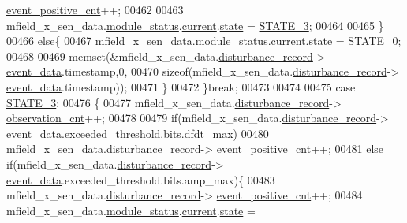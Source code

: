 \begin{DoxyCode}
      \hyperlink{a00028_a7397b9d76d4b57500f27bb23d258a18a}{event\_positive\_cnt}++;
00462 
00463                mfield\_x\_sen\_data.\hyperlink{a00025_adfab5a5d8b45a93dfb13edb24e2b80e3}{module\_status}.\hyperlink{a00019_acf41ffc11da291c2f9f0fcb02ee72b98}{current}.\hyperlink{a00019_a6b8d8e916bc56265a3fd279bd26b6d1b}{state} = 
      \hyperlink{a00021_ad87f1bc8466a25d9f7da68717d324a22}{STATE\_3};
00464 
00465              \}
00466              \textcolor{keywordflow}{else}\{
00467                mfield\_x\_sen\_data.\hyperlink{a00025_adfab5a5d8b45a93dfb13edb24e2b80e3}{module\_status}.\hyperlink{a00019_acf41ffc11da291c2f9f0fcb02ee72b98}{current}.\hyperlink{a00019_a6b8d8e916bc56265a3fd279bd26b6d1b}{state} = 
      \hyperlink{a00021_ad6739dbbe5581cac99b7dc8a5e09949c}{STATE\_0};
00468 
00469                memset(&mfield\_x\_sen\_data.\hyperlink{a00025_ac9b38e2c1d3f1013a88d33506c754152}{disturbance\_record}->
      \hyperlink{a00028_a8c0bda69e71ef674e60da47ad0be9ab0}{event\_data}.timestamp,0,
00470                                  \textcolor{keyword}{sizeof}(mfield\_x\_sen\_data.\hyperlink{a00025_ac9b38e2c1d3f1013a88d33506c754152}{disturbance\_record}->
      \hyperlink{a00028_a8c0bda69e71ef674e60da47ad0be9ab0}{event\_data}.timestamp));
00471             \}
00472         \}\textcolor{keywordflow}{break};
00473 
00474 
00475         \textcolor{keywordflow}{case} \hyperlink{a00021_ad87f1bc8466a25d9f7da68717d324a22}{STATE\_3}: 
00476         \{
00477             mfield\_x\_sen\_data.\hyperlink{a00025_ac9b38e2c1d3f1013a88d33506c754152}{disturbance\_record}->
      \hyperlink{a00028_ad5b0bac02ce266b91b2b52a1c3ea1d78}{observation\_cnt}++;
00478 
00479             \textcolor{keywordflow}{if}(mfield\_x\_sen\_data.\hyperlink{a00025_ac9b38e2c1d3f1013a88d33506c754152}{disturbance\_record}->
      \hyperlink{a00028_a8c0bda69e71ef674e60da47ad0be9ab0}{event\_data}.exceeded\_threshold.bits.dfdt\_max)
00480                mfield\_x\_sen\_data.\hyperlink{a00025_ac9b38e2c1d3f1013a88d33506c754152}{disturbance\_record}->
      \hyperlink{a00028_a7397b9d76d4b57500f27bb23d258a18a}{event\_positive\_cnt}++;
00481             \textcolor{keywordflow}{else}  \textcolor{keywordflow}{if}(mfield\_x\_sen\_data.\hyperlink{a00025_ac9b38e2c1d3f1013a88d33506c754152}{disturbance\_record}->
      \hyperlink{a00028_a8c0bda69e71ef674e60da47ad0be9ab0}{event\_data}.exceeded\_threshold.bits.amp\_max)\{
00483                mfield\_x\_sen\_data.\hyperlink{a00025_ac9b38e2c1d3f1013a88d33506c754152}{disturbance\_record}->
      \hyperlink{a00028_a7397b9d76d4b57500f27bb23d258a18a}{event\_positive\_cnt}++;
00484                mfield\_x\_sen\_data.\hyperlink{a00025_adfab5a5d8b45a93dfb13edb24e2b80e3}{module\_status}.\hyperlink{a00019_acf41ffc11da291c2f9f0fcb02ee72b98}{current}.\hyperlink{a00019_a6b8d8e916bc56265a3fd279bd26b6d1b}{state} = 

\end{DoxyCode}
